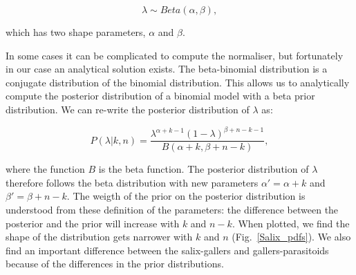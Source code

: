 \documentclass[12pt]{article}
\begin{document}
      \begin{equation}
        \lambda \sim Beta(\alpha,\beta) , \label{prior}
      \end{equation}

      \noindent which has two shape parameters, $\alpha$ and $\beta$. 

     In some cases it can be complicated to compute the normaliser, but fortunately in our case an analytical solution exists. The beta-binomial distribution is a conjugate distribution of the binomial distribution. This allows us to analytically compute the posterior distribution of a binomial model with a beta prior distribution. We can re-write the posterior distribution of $\lambda$ as:

      \begin{equation}
        P(\lambda|k,n) = \frac{\lambda^{\alpha+k-1}(1-\lambda)^{\beta+n-k-1}}{B(\alpha+k,\beta+n-k)} , \label{posterior}
      \end{equation}

      


      \noindent where the function $B$ is the beta function. The posterior distribution of $\lambda$ therefore follows the beta distribution with new parameters $\alpha'= \alpha+k$ and $\beta'=\beta+n-k$. The weigth of the prior on the posterior distribution is understood from these definition of the parameters: the difference between the posterior and the prior will increase with $k$ and $n-k$. When plotted, we find the shape of the distribution gets narrower with $k$ and $n$ (Fig.~\ref{Salix_pdfs}). We also find an important difference between the salix-gallers and gallers-parasitoids because of the differences in the prior distributions. 


\end{document}
